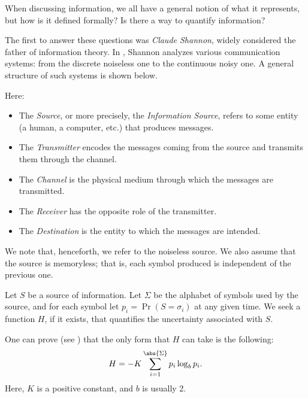 \documentclass{subfiles}
\begin{document}
    When discussing information, we all have a general notion of what it represents, 
        but how is it defined formally? Is there a way to quantify information?

    The first to answer these questions was \emph{Claude Shannon}, 
        widely considered the father of information theory.
        In \cite{shannon1948}, Shannon analyzes various communication systems:
        from the discrete noiseless one to the continuous noisy one.
    A general structure of such systems is shown below.
    

    Here:
    \begin{itemize}
        \item The \emph{Source}, or more precisely, 
            the \emph{Information Source}, refers to some entity
            (a human, a computer, etc.) that produces messages.

        \item The \emph{Transmitter} encodes the messages coming from the source
            and transmits them through the channel.

        \item The \emph{Channel} is the physical medium through which the messages
            are transmitted.

        \item The \emph{Receiver} has the opposite role of the transmitter.

        \item The \emph{Destination} is the entity to which the messages are intended.
    \end{itemize}

    \begin{remark*}
        We note that, henceforth, we refer to the noiseless source.
        We also assume that the source is memoryless; 
        that is, each symbol produced is independent of the previous one.
    \end{remark*}

    Let \(S\) be a source of information. 
        Let \(\Sigma\) be the alphabet of symbols used by the source,
        and for each symbol let \(p_{i} = \Pr(S = \sigma_{i})\) at any given time.
        We seek a function \(H\), if it exists, 
        that quantifies the uncertainty associated with \(S\).

    One can prove (see \cite[Appendix 2]{shannon1948}) that
        the only form that \(H\) can take is the following:
        \begin{equation}\label{Eq:1}
            H = -K \sum_{i = 1}^{\abs{\Sigma}}{p_{i} \log_{b} p_{i}}\text{.}
        \end{equation}
        Here, \(K\) is a positive constant, and \(b\) is usually 2.
\end{document}
